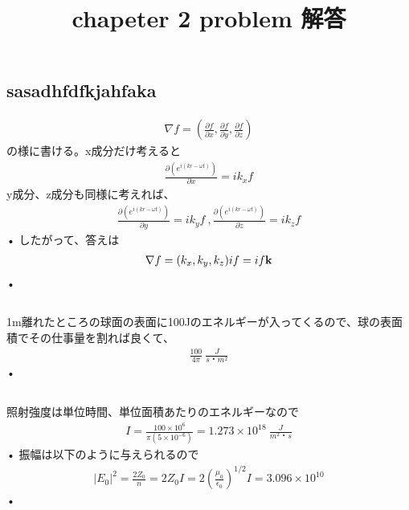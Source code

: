 \documentclass{jsarticle}
\title{chapeter 2 problem 解答}
\begin{document}
\maketitle
\renewcommand{\thesubsection}{2.\arabic{subsection})}





\subsection{sasadhfdfkjahfaka}

\begin{align}
\nabla f = (\frac{\partial f}{\partial x},\frac{\partial f}{\partial y},\frac{\partial f}{\partial z}) 
\end{align}
の様に書ける。x成分だけ考えると
\begin{align}
\frac{\partial (e^{i(kr - \omega t)})}{\partial x} = ik_{x}f 
\end{align}
y成分、z成分も同様に考えれば、
\begin{align}
\frac{\partial (e^{i(kr - \omega t)})}{\partial y} = ik_{y}f \ ,
\frac{\partial (e^{i(kr - \omega t)})}{\partial z} = ik_{z}f
\end{align}•
したがって、答えは
\begin{align}
\nabla f = (k_{x},k_{y},k_{z})if = if\bf{k}
\end{align}•




\subsection{}
1m離れたところの球面の表面に100Jのエネルギーが入ってくるので、球の表面積でその仕事量を割れば良くて、
\begin{align}
\frac{100}{4\pi} \  \frac{J}{s・m^2}
\end{align}•




\subsection{}
照射強度は単位時間、単位面積あたりのエネルギーなので
\begin{align}
I = \frac{100\times 10^{6}}{\pi(5 \times 10^{-6})} = 1.273 \times 10^{18} \ \frac{J}{m^2・s}
\end{align}•
振幅は以下のように与えられるので
\begin{align}
|E_0|^{2} = \frac{2Z_0}{n} = 2Z_0 I = 2(\frac{\mu_0}{\epsilon_0})^{1/2}I = 3.096\times 10^{10}
\end{align}•
\end{document}
